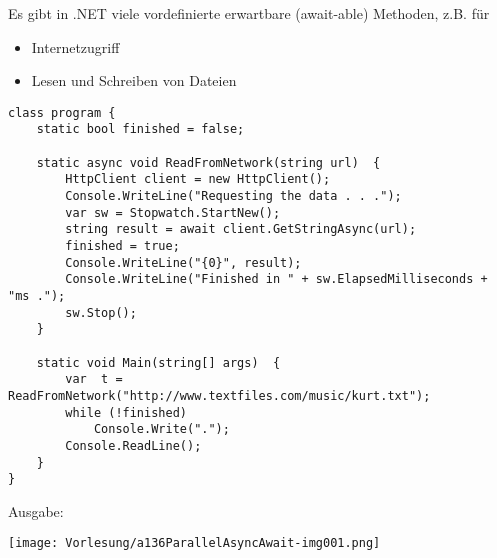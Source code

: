 Es gibt in .NET viele vordefinierte erwartbare (await-able) Methoden, z.B. für
\begin{itemize}
\item Internetzugriff
\item Lesen und Schreiben von Dateien
\end{itemize}

\begin{lstlisting}[language={[Sharp]C}]
class program {
	static bool finished = false;
	
	static async void ReadFromNetwork(string url)  {  
		HttpClient client = new HttpClient();
		Console.WriteLine("Requesting the data . . .");
		var sw = Stopwatch.StartNew();
		string result = await client.GetStringAsync(url);  
		finished = true;
		Console.WriteLine("{0}", result);  
		Console.WriteLine("Finished in " + sw.ElapsedMilliseconds + "ms .");  
		sw.Stop();
	}

	static void Main(string[] args)  {
		var  t = ReadFromNetwork("http://www.textfiles.com/music/kurt.txt");
		while (!finished) 
			Console.Write(".");  
		Console.ReadLine();  
	}
}
\end{lstlisting}
Ausgabe:
\begin{center}
\texttt{[image: Vorlesung/a136ParallelAsyncAwait-img001.png]}
\end{center}